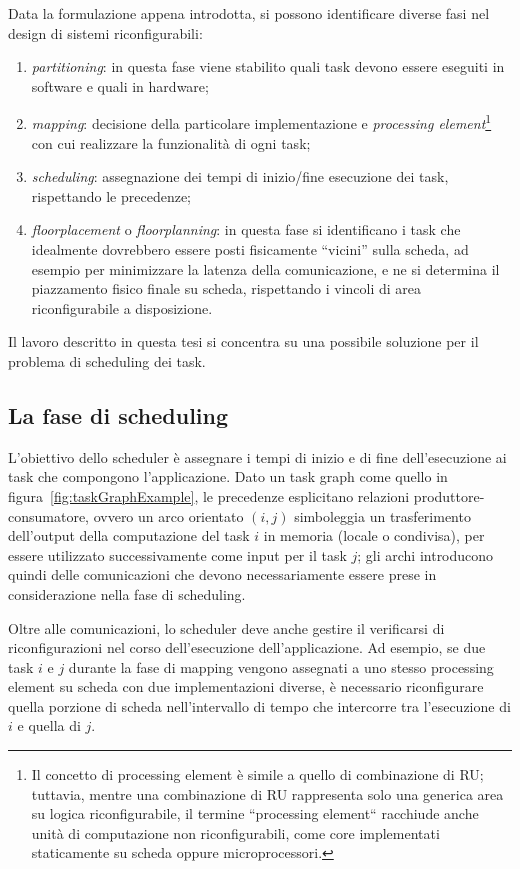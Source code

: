 Data la formulazione appena introdotta, si possono identificare diverse fasi nel
design di sistemi riconfigurabili:
\begin{enumerate}
 \item \emph{partitioning}: in questa fase viene stabilito quali task devono essere
 eseguiti in software e quali in hardware;
 \item \emph{mapping}: decisione della particolare implementazione e \emph{processing
 element}\footnote{Il concetto di processing element è simile a quello di combinazione
 di \ac{RU}; tuttavia, mentre una combinazione di \ac{RU} rappresenta solo una generica
 area su logica riconfigurabile, il termine ``processing element`` racchiude anche unità
 di computazione non riconfigurabili, come core implementati staticamente su scheda oppure
 microprocessori.}
 con cui realizzare la funzionalità di ogni task;
 \item \emph{scheduling}: assegnazione dei tempi di inizio/fine esecuzione dei task,
 rispettando le precedenze;
 \item \emph{floorplacement} o \emph{floorplanning}: in questa fase si identificano i 
task che idealmente dovrebbero essere posti fisicamente ``vicini'' sulla scheda, ad 
esempio per minimizzare la latenza della comunicazione, e ne si determina il piazzamento
fisico finale su scheda, rispettando i vincoli di area riconfigurabile a disposizione.
\end{enumerate}
Il lavoro descritto in questa tesi si concentra su una possibile soluzione per il 
problema di scheduling dei task.


\subsection{La fase di scheduling}
\label{subsec:faseSchedulingIntro}
L'obiettivo dello scheduler è assegnare i tempi di inizio e di fine dell'esecuzione ai
task che compongono l'applicazione. Dato un task graph come quello in
figura~\ref{fig:taskGraphExample},
le precedenze esplicitano relazioni produttore-consumatore,
ovvero un arco orientato $(i,j)$ simboleggia un trasferimento dell'output della
computazione del task $i$ in memoria (locale o condivisa), per essere utilizzato
successivamente come input per il task $j$; gli archi introducono quindi delle
comunicazioni che devono necessariamente essere prese in considerazione nella fase 
di scheduling.


Oltre alle comunicazioni, lo scheduler deve anche gestire il verificarsi di 
riconfigurazioni nel corso dell'esecuzione dell'applicazione. Ad esempio, se due task $i$ 
e $j$ durante la fase di mapping vengono assegnati a uno stesso processing element su 
scheda con due implementazioni diverse, è necessario riconfigurare quella porzione di 
scheda nell'intervallo di tempo che intercorre tra l'esecuzione di $i$ e quella di $j$.

